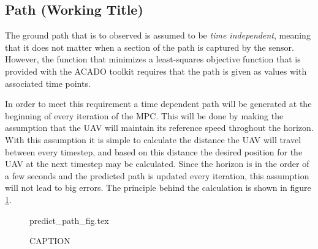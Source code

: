\subsection{Path (Working Title)}

The ground path that is to observed is assumed to be \textit{time independent}, meaning that it does not matter when a section of the path is captured by the sensor. However, the function that minimizes a least-squares objective function that is provided with the ACADO toolkit requires that the path is given as values with associated time points.

In order to meet this requirement a time dependent path will be generated at the beginning of every iteration of the MPC. This will be done by making the assumption that the UAV will maintain its reference speed throghout the horizon. With this assumption it is simple to calculate the distance the UAV will travel between every timestep, and based on this distance the desired position for the UAV at the next timestep may be calculated. Since the horizon is in the order of a few seconds and the predicted path is updated every iteration, this assumption will not lead to big errors. The principle behind the calculation is shown in figure \ref{fig:predict_path}.

\begin{figure}
	{predict_path_fig.tex}
	\caption{CAPTION}
	\label{fig:predict_path}
\end{figure}